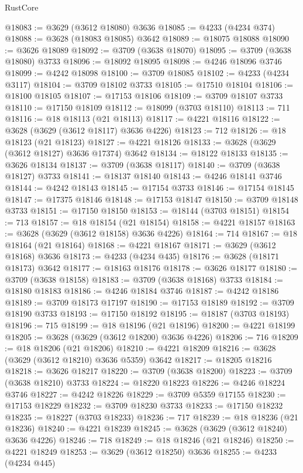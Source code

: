 \begin{lexlean}{RustCore}
\begin{coremodule}
@18083 := @3629 (@3612 @18080) @3636
@18085 := @4233 (@4234 @374)
@18088 := @3628 (@18083 @18085) @3642
@18089 := @18075 @18088
@18090 := @3626 @18089
@18092 := @3709 (@3638 @18070)
@18095 := @3709 (@3638 @18080) @3733
@18096 := @18092 @18095
@18098 := @4246 @18096 @3746
@18099 := @4242 @18098
@18100 := @3709 @18085
@18102 := @4233 (@4234 @3117)
@18104 := @3709 @18102 @3733
@18105 := @17510 @18104
@18106 := @18100 @18105
@18107 := @17153 @18106
@18109 := @3709 @18107 @3733
@18110 := @17150 @18109
@18112 := @18099 (@3703 @18110)
@18113 := 711
@18116 := @18 @18113 (@21 @18113)
@18117 := @4221 @18116
@18122 := @3628 (@3629 (@3612 @18117) @3636 @4226)
@18123 := 712
@18126 := @18 @18123 (@21 @18123)
@18127 := @4221 @18126
@18133 := @3628 (@3629 (@3612 @18127) @3636 @17374) @3642
@18134 := @18122 @18133
@18135 := @3626 @18134
@18137 := @3709 (@3638 @18117)
@18140 := @3709 (@3638 @18127) @3733
@18141 := @18137 @18140
@18143 := @4246 @18141 @3746
@18144 := @4242 @18143
@18145 := @17154 @3733
@18146 := @17154 @18145
@18147 := @17375 @18146
@18148 := @17153 @18147
@18150 := @3709 @18148 @3733
@18151 := @17150 @18150
@18153 := @18144 (@3703 @18151)
@18154 := 713
@18157 := @18 @18154 (@21 @18154)
@18158 := @4221 @18157
@18163 := @3628 (@3629 (@3612 @18158) @3636 @4226)
@18164 := 714
@18167 := @18 @18164 (@21 @18164)
@18168 := @4221 @18167
@18171 := @3629 (@3612 @18168) @3636
@18173 := @4233 (@4234 @435)
@18176 := @3628 (@18171 @18173) @3642
@18177 := @18163 @18176
@18178 := @3626 @18177
@18180 := @3709 (@3638 @18158)
@18183 := @3709 (@3638 @18168) @3733
@18184 := @18180 @18183
@18186 := @4246 @18184 @3746
@18187 := @4242 @18186
@18189 := @3709 @18173 @17197
@18190 := @17153 @18189
@18192 := @3709 @18190 @3733
@18193 := @17150 @18192
@18195 := @18187 (@3703 @18193)
@18196 := 715
@18199 := @18 @18196 (@21 @18196)
@18200 := @4221 @18199
@18205 := @3628 (@3629 (@3612 @18200) @3636 @4226)
@18206 := 716
@18209 := @18 @18206 (@21 @18206)
@18210 := @4221 @18209
@18216 := @3628 (@3629 (@3612 @18210) @3636 @5359) @3642
@18217 := @18205 @18216
@18218 := @3626 @18217
@18220 := @3709 (@3638 @18200)
@18223 := @3709 (@3638 @18210) @3733
@18224 := @18220 @18223
@18226 := @4246 @18224 @3746
@18227 := @4242 @18226
@18229 := @3709 @5359 @17155
@18230 := @17153 @18229
@18232 := @3709 @18230 @3733
@18233 := @17150 @18232
@18235 := @18227 (@3703 @18233)
@18236 := 717
@18239 := @18 @18236 (@21 @18236)
@18240 := @4221 @18239
@18245 := @3628 (@3629 (@3612 @18240) @3636 @4226)
@18246 := 718
@18249 := @18 @18246 (@21 @18246)
@18250 := @4221 @18249
@18253 := @3629 (@3612 @18250) @3636
@18255 := @4233 (@4234 @445)

\end{coremodule}
\end{lexlean}
